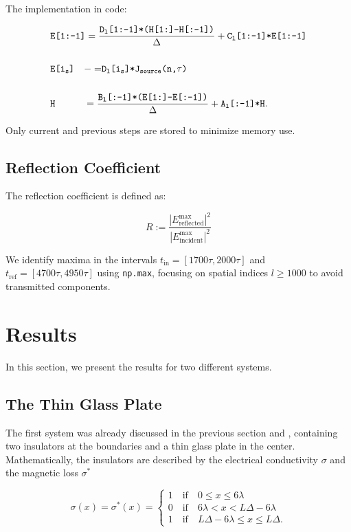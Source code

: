\documentclass[11pt, A4paper]{article}
\begin{document}
The implementation in code:

\begin{align*}
    &\texttt{E[1:-1]} = {\texttt{D}_\texttt{l} \texttt{[1:-1]*(H[1:]-H[:-1])} \over \Delta} + \texttt{C}_\texttt{l}\texttt{[1:-1]*E[1:-1]}\\
    \\
    &\texttt{E[i}_\texttt{s}\texttt{]}\quad {-= }  \texttt{D}_\texttt{l}\texttt{[i}_\texttt{s}\texttt{]}\texttt{*}\texttt{J}_\texttt{source}\texttt{(n,}\tau\texttt{)}\\
    \\
    & \texttt{H} \qquad \quad = {\texttt{B}_\texttt{l}\texttt{[:-1]*(E[1:]-E[:-1])} \over \Delta} + \texttt{A}_\texttt{l}\texttt{[:-1]*H}.
\end{align*}

Only current and previous steps are stored to minimize memory use.

\subsection*{Reflection Coefficient}
The reflection coefficient is defined as:

\begin{equation}
R := \frac{|E^\text{max}_\text{reflected}|^2}{|E^\text{max}_\text{incident}|^2}
\label{eq: R}
\end{equation}

We identify maxima in the intervals $t_{\text{in}} = [1700\tau, 2000\tau]$ and $t_{\text{ref}} = [4700\tau, 4950\tau]$ using \texttt{np.max}, focusing on spatial indices $l \geq 1000$ to avoid transmitted components.

\clearpage
\section{Results}
In this section, we present the results for two different systems.
\subsection{The Thin Glass Plate}
The first system was already discussed in the previous section and , containing two insulators at the boundaries and a thin glass plate in the center. Mathematically, the insulators are described by the electrical conductivity $\sigma$ and the magnetic loss $\sigma^*$

\begin{equation}
    \sigma (x) = \sigma^* (x) = 
    \begin{cases}
        1 \quad \text{if} \quad 0 \leq x \leq 6 \lambda \\
        0 \quad \text{if} \quad 6 \lambda < x < L \Delta - 6 \lambda \\
        1 \quad \text{if} \quad L \Delta - 6 \lambda \leq x \leq L \Delta.
    \end{cases}
    \label{eq: sigma}
\end{equation}
\end{document}
